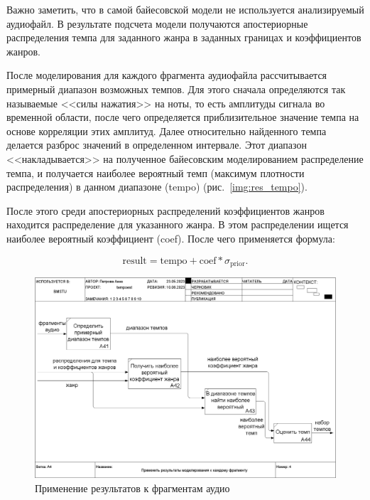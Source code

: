 Важно заметить, что в самой байесовской модели не используется анализируемый аудиофайл. В результате подсчета модели получаются апостериорные распределения темпа для заданного жанра в заданных границах и коэффициентов жанров.

После моделирования для каждого фрагмента аудиофайла рассчитывается примерный диапазон возможных темпов. Для этого сначала определяются так называемые <<силы нажатия>> на ноты, то есть амплитуды сигнала во временной области, после чего определяется приблизительное значение темпа на основе корреляции этих амплитуд. Далее относительно найденного темпа делается разброс значений в определенном интервале. Этот диапазон <<накладывается>> на полученное байесовским моделированием распределение темпа, и получается наиболее вероятный темп (максимум плотности распределения) в данном диапазоне (tempo) (рис.~\ref{img:res_tempo}).

После этого среди апостериорных распределений коэффициентов жанров находится распределение для указанного жанра. В этом распределении ищется наиболее вероятный коэффициент (coef). После чего применяется формула:

\begin{equation}
	\text{result} = \text{tempo} + \text{coef} * \sigma_{\text{prior}}.
\end{equation}

\begin{figure}[h]
	\centering
	\includegraphics[scale=0.25]{inc/img/tempo_idef/04_A4.png}
	\caption{Применение результатов к фрагментам аудио}
	\label{img:tempo_3}
\end{figure}

